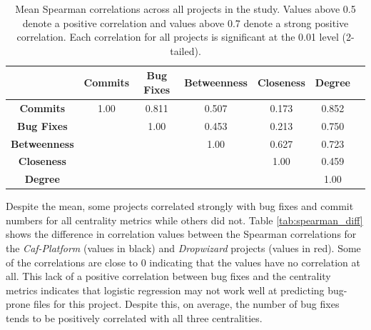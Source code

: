 \documentclass{sig-alternate-05-2015}
\begin{document}
\begin{table}
\centering
\caption{Mean Spearman correlations across all projects in the study. Values above 0.5 denote a positive correlation and values above 0.7 denote a strong positive correlation. Each correlation for all projects is significant at the 0.01 level (2-tailed).}
\label{tab:spearman}
\begin{tabular}{|c|c|c|c|c|c|c|} \hline
&\textbf{Commits}&\textbf{Bug Fixes}&\textbf{Betweenness}&\textbf{Closeness}&\textbf{Degree}\\ \hline
\textbf{Commits}&1.00&0.811&0.507&0.173&0.852\\ \hline
\textbf{Bug Fixes}&&1.00&0.453&0.213&0.750\\ \hline
\textbf{Betweenness}&&&1.00&0.627&0.723\\ \hline
\textbf{Closeness}&&&&1.00&0.459\\ \hline
\textbf{Degree}&&&&&1.00\\ \hline
\end{tabular}
\end{table}

Despite the mean, some projects correlated strongly with bug fixes and commit numbers for all centrality metrics while others did not. Table \ref{tab:spearman_diff} shows the difference in correlation values between the Spearman correlations for the \textit{Caf-Platform} (values in black) and \textit{Dropwizard} projects (values in red). Some of the correlations are close to 0 indicating that the values have no correlation at all. This lack of a positive correlation between bug fixes and the centrality metrics indicates that logistic regression may not work well at predicting bug-prone files for this project. Despite this, on average, the number of bug fixes tends to be positively correlated with all three centralities.
\end{document}
